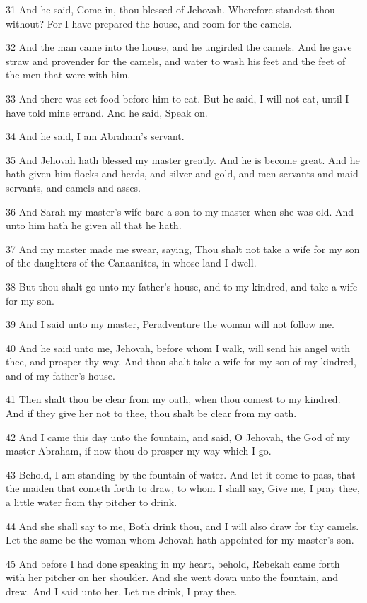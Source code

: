 \par 31 And he said, Come in, thou blessed of Jehovah. Wherefore standest thou without? For I have prepared the house, and room for the camels.
\par 32 And the man came into the house, and he ungirded the camels. And he gave straw and provender for the camels, and water to wash his feet and the feet of the men that were with him.
\par 33 And there was set food before him to eat. But he said, I will not eat, until I have told mine errand. And he said, Speak on.
\par 34 And he said, I am Abraham's servant.
\par 35 And Jehovah hath blessed my master greatly. And he is become great. And he hath given him flocks and herds, and silver and gold, and men-servants and maid-servants, and camels and asses.
\par 36 And Sarah my master's wife bare a son to my master when she was old. And unto him hath he given all that he hath.
\par 37 And my master made me swear, saying, Thou shalt not take a wife for my son of the daughters of the Canaanites, in whose land I dwell.
\par 38 But thou shalt go unto my father's house, and to my kindred, and take a wife for my son.
\par 39 And I said unto my master, Peradventure the woman will not follow me.
\par 40 And he said unto me, Jehovah, before whom I walk, will send his angel with thee, and prosper thy way. And thou shalt take a wife for my son of my kindred, and of my father's house.
\par 41 Then shalt thou be clear from my oath, when thou comest to my kindred. And if they give her not to thee, thou shalt be clear from my oath.
\par 42 And I came this day unto the fountain, and said, O Jehovah, the God of my master Abraham, if now thou do prosper my way which I go.
\par 43 Behold, I am standing by the fountain of water. And let it come to pass, that the maiden that cometh forth to draw, to whom I shall say, Give me, I pray thee, a little water from thy pitcher to drink.
\par 44 And she shall say to me, Both drink thou, and I will also draw for thy camels. Let the same be the woman whom Jehovah hath appointed for my master's son.
\par 45 And before I had done speaking in my heart, behold, Rebekah came forth with her pitcher on her shoulder. And she went down unto the fountain, and drew. And I said unto her, Let me drink, I pray thee.

